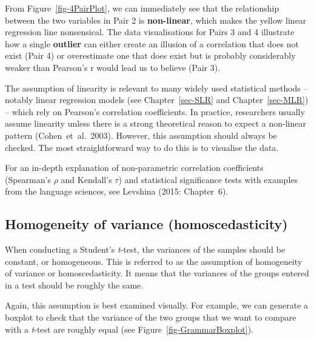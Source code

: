 \documentclass[
  letterpaper,
  DIV=11,
  numbers=noendperiod]{scrreprt}
\begin{document}
From Figure~\ref{fig-4PairPlot}, we can immediately see that the
relationship between the two variables in Pair 2 is \textbf{non-linear},
which makes the yellow linear regression line nonsensical. The data
visualisations for Pairs 3 and 4 illustrate how a single
\textbf{outlier} can either create an illusion of a correlation that
does not exist (Pair 4) or overestimate one that does exist but is
probably considerably weaker than Pearson's r would lead us to believe
(Pair 3).

The assumption of linearity is relevant to many widely used statistical
methods -- notably linear regression models (see Chapter~\ref{sec-SLR}
and Chapter~\ref{sec-MLR}) -- which rely on Pearson's correlation
coefficients. In practice, researchers usually assume linearity unless
there is a strong theoretical reason to expect a non‑linear pattern
(Cohen \,et \,al.\, 2003). However, this assumption should always be
checked. The most straightforward way to do this is to visualise the
data.

\begin{tcolorbox}[enhanced jigsaw, arc=.35mm, bottomrule=.15mm, bottomtitle=1mm, breakable, colback=white, colbacktitle=quarto-callout-note-color!10!white, colframe=quarto-callout-note-color-frame, coltitle=black, left=2mm, leftrule=.75mm, opacityback=0, opacitybacktitle=0.6, rightrule=.15mm, title=\textcolor{quarto-callout-note-color}{\faInfo}\hspace{0.5em}{Non-parametric correlations}, titlerule=0mm, toprule=.15mm, toptitle=1mm]

For an in-depth explanation of non-parametric correlation coefficients
(Spearman's \(\rho\) and Kendall's \(\tau\)) and statistical
significance tests with examples from the language sciences, see
Levshina (2015: Chapter~6).

\end{tcolorbox}

\subsection{Homogeneity of variance
(homoscedasticity)}\label{sec-Homoscedasticity}

When conducting a Student's \emph{t}-test, the variances of the samples
should be constant, or homogeneous. This is referred to as the
assumption of homogeneity of variance or homoscedasticity. It means that
the variances of the groups entered in a test should be roughly the
same.

Again, this assumption is best examined visually. For example, we can
generate a boxplot to check that the variance of the two groups that we
want to compare with a \emph{t}-test are roughly equal (see
Figure~\ref{fig-GrammarBoxplot}).
\end{document}
